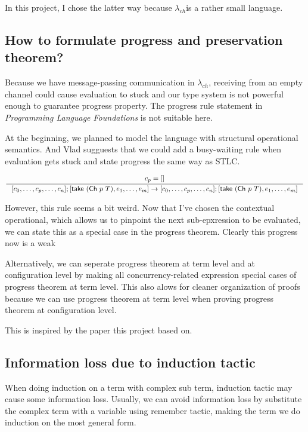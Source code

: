 \documentclass{article}
\newcommand{\lambdach}{$\lambda_{ch}$}
\newcommand{\sco}[1]{\textsf{#1}}
\newcommand{\take}[1]{\sco{take } #1}
\newcommand{\channel}[2]{\sco{Ch }#1\ #2}
\begin{document}
In this project, I chose the latter way because \lambdach is a rather small language.

\subsection{How to formulate progress and preservation theorem?}

Because we have message-passing communication in \lambdach, receiving from an empty channel could cause
evaluation to stuck and our type system is not powerful enough to guarantee progress property.
The progress rule statement in \textit{Programming Language Foundations} is not
suitable here.

At the beginning, we planned to model the language with structural operational semantics.
And Vlad sugguests that we could add a busy-waiting rule when evaluation gets stuck and state
progress the same way as STLC.

\begin{gather*}
    \inference{
        c_p = []
    }{
        [c_0,\dots,c_p,\dots,c_n];[\take{(\channel{p}{T})},e_1,\dots,e_m] ->
        [c_0,\dots,c_p,\dots,c_n];[\take{(\channel{p}{T})},e_1,\dots,e_m]
    }
\end{gather*}

However, this rule seems a bit weird. Now that I've chosen the contextual operational, which allows us to
pinpoint the next sub-epxression to be evaluated, we can state this as a special case in the progress theorem.
Clearly this progress now is a weak 

Alternatively, we can seperate progress theorem at term level and at configuration level by making all
concurrency-related expression special cases of progress theorem at term level. This also alows for cleaner
organization of proofs because we can use progress theorem at term level when proving progress theorem at
configuration level.

This is inspired by the paper\cite{fowler2019typed} this project based on.

\subsection{Information loss due to \sco{induction} tactic}

When doing induction on a term with complex sub term, \sco{induction} tactic may cause some information loss.
Usually, we can avoid information loss by substitute the complex term with a variable using \sco{remember} tactic, 
making the term we do induction on the most general form.
\end{document}
